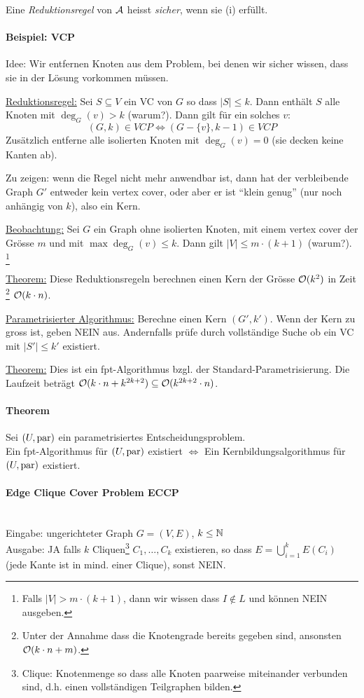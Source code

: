 Eine \emph{Reduktionsregel} von $\mathcal{A}$ heisst \emph{sicher}, wenn sie (i) erfüllt.

\paragraph{Beispiel: VCP} Idee: Wir entfernen Knoten aus dem Problem, bei denen wir 
sicher wissen, dass sie in der Lösung vorkommen müssen.

\underline{Reduktionsregel:}
Sei $S \subseteq V$ ein VC von $G$ so dass $|S| \leq k$. Dann enthält $S$ alle Knoten 
mit $\deg_G(v) > k$ (warum?).
Dann gilt für ein solches $v$:
$$ (G, k) \in VCP \iff (G-\{v\}, k-1) \in VCP $$
Zusätzlich entferne alle isolierten Knoten mit $\deg_G(v) = 0$ (sie decken keine Kanten ab).

Zu zeigen: wenn die Regel nicht mehr anwendbar ist, dann hat der verbleibende Graph 
$G'$ entweder kein vertex cover,
oder aber er ist ``klein genug'' (nur noch anhängig von $k$), also ein Kern.

\underline{Beobachtung:}
Sei $G$ ein Graph ohne isolierten Knoten, mit einem vertex cover der Grösse $m$ und 
mit $\max \deg_G(v) \leq k$.
Dann gilt $|V| \leq m \cdot (k+1)$ (warum?).%
\footnote{Falls $|V| > m \cdot (k+1)$, dann wir wissen dass $I \notin L$ und können NEIN ausgeben.}

\underline{Theorem:}
Diese Reduktionsregeln berechnen einen Kern der Grösse $\mathcal{O} (k^2)$ in Zeit%
\footnote{Unter der Annahme dass die Knotengrade bereits gegeben sind, ansonsten $\mathcal{O} (k \cdot n + m)$.}
$\mathcal{O} (k \cdot n)$.

\underline{Parametrisierter Algorithmus:}
Berechne einen Kern $(G', k')$. Wenn der Kern zu gross ist, geben NEIN aus.
Andernfalls prüfe durch vollständige Suche ob ein VC mit $|S'| \leq k'$ existiert.

\underline{Theorem:}
Dies ist ein fpt-Algorithmus bzgl. der Standard-Parametrisierung. Die Laufzeit beträgt
$\mathcal{O} (k \cdot n + k^{2k+2}) \subseteq \mathcal{O} (k^{2k+2} \cdot n)$.

\paragraph{Theorem}
Sei $(U, \text{par})$ ein parametrisiertes Entscheidungsproblem. \\
Ein fpt-Algorithmus für $(U, \text{par})$ existiert $\iff$ Ein Kernbildungsalgorithmus für $(U, \text{par})$ existiert.

\paragraph{Edge Clique Cover Problem ECCP} \mbox{} \\
Eingabe: ungerichteter Graph $G=(V,E)$, $k \leq \mathbb{N}$ \\
Ausgabe: JA falls $k$ Cliquen\footnote{Clique: Knotenmenge so dass alle Knoten paarweise 
miteinander verbunden sind,
d.h. einen vollständigen Teilgraphen bilden.}
$C_1, \dots, C_k$ existieren, so dass $E = \bigcup_{i=1}^k E(C_i)$ (jede Kante ist in 
mind. einer Clique), sonst NEIN.

